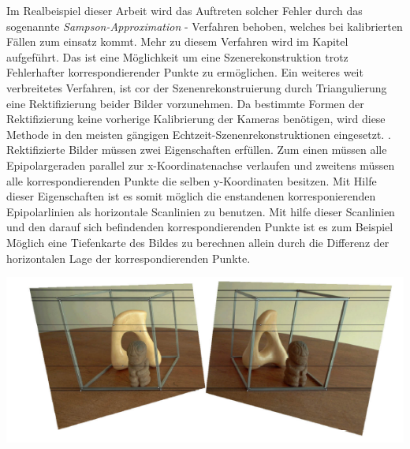 Im Realbeispiel dieser Arbeit wird das Auftreten solcher Fehler durch das sogenannte \textit{Sampson-Approximation} - Verfahren behoben, welches bei kalibrierten Fällen zum einsatz kommt\cite{HZ}. Mehr zu diesem Verfahren wird im Kapitel  aufgeführt. Das ist eine Möglichkeit um eine Szenerekonstruktion trotz Fehlerhafter korrespondierender Punkte zu ermöglichen. Ein weiteres weit verbreitetes Verfahren, ist cor der Szenenrekonstruierung durch Triangulierung eine Rektifizierung beider Bilder vorzunehmen\cite{MatlabRec,ZZ,Javier,Fusiello}. Da bestimmte Formen der Rektifizierung keine vorherige Kalibrierung der Kameras benötigen, wird diese Methode in den meisten gängigen Echtzeit-Szenenrekonstruktionen eingesetzt. \cite{Fusiello,Javier,R.H.}.
 Rektifizierte Bilder müssen zwei Eigenschaften erfüllen. Zum einen müssen alle Epipolargeraden parallel zur x-Koordinatenachse verlaufen und zweitens müssen alle korrespondierenden Punkte die selben y-Koordinaten besitzen\cite{ZZ}. Mit Hilfe dieser Eigenschaften ist es somit möglich die enstandenen korresponierenden Epipolarlinien als horizontale Scanlinien zu benutzen\cite{Javier,ZZ}. Mit hilfe dieser Scanlinien und den darauf sich befindenden korrespondierenden Punkte ist es zum Beispiel Möglich eine Tiefenkarte des Bildes zu berechnen allein durch die Differenz der horizontalen Lage der korrespondierenden Punkte\cite{Javier,ZZ}. \\
 
 
 \begin{minipage}{\linewidth}
 	\centering
 	\includegraphics[width=.8\linewidth]{images/rectifiziertesBildAusZZ.png}
 \end{minipage}\\ \\

